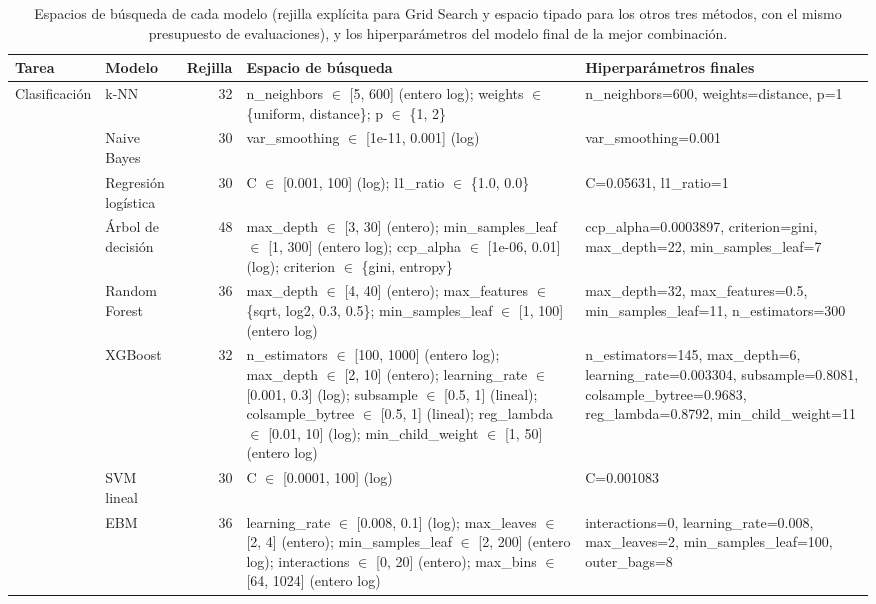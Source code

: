 \begin{table}
\caption{Espacios de búsqueda de cada modelo (rejilla explícita para Grid Search y espacio tipado para los otros tres métodos, con el mismo presupuesto de evaluaciones), y los hiperparámetros del modelo final de la mejor combinación.}\label{tab:espacios}
\scriptsize\setlength{\tabcolsep}{2.8pt}
\begin{tabular}{llr>{\raggedright\arraybackslash}p{6.2cm}>{\raggedright\arraybackslash}p{5cm}}
\toprule
\textbf{Tarea} & \textbf{Modelo} & \textbf{Rejilla} & \textbf{Espacio de búsqueda} & \textbf{Hiperparámetros finales} \\
\midrule
Clasificación & k-NN & 32 & n\_neighbors $\in$ [5, 600] (entero log); weights $\in$ \{uniform, distance\}; p $\in$ \{1, 2\} & n\_neighbors=600, weights=distance, p=1 \\
 & Naive Bayes & 30 & var\_smoothing $\in$ [1e-11, 0.001] (log) & var\_smoothing=0.001 \\
 & Regresión logística & 30 & C $\in$ [0.001, 100] (log); l1\_ratio $\in$ \{1.0, 0.0\} & C=0.05631, l1\_ratio=1 \\
 & Árbol de decisión & 48 & max\_depth $\in$ [3, 30] (entero); min\_samples\_leaf $\in$ [1, 300] (entero log); ccp\_alpha $\in$ [1e-06, 0.01] (log); criterion $\in$ \{gini, entropy\} & ccp\_alpha=0.0003897, criterion=gini, max\_depth=22, min\_samples\_leaf=7 \\
 & Random Forest & 36 & max\_depth $\in$ [4, 40] (entero); max\_features $\in$ \{sqrt, log2, 0.3, 0.5\}; min\_samples\_leaf $\in$ [1, 100] (entero log) & max\_depth=32, max\_features=0.5, min\_samples\_leaf=11, n\_estimators=300 \\
 & XGBoost & 32 & n\_estimators $\in$ [100, 1000] (entero log); max\_depth $\in$ [2, 10] (entero); learning\_rate $\in$ [0.001, 0.3] (log); subsample $\in$ [0.5, 1] (lineal); colsample\_bytree $\in$ [0.5, 1] (lineal); reg\_lambda $\in$ [0.01, 10] (log); min\_child\_weight $\in$ [1, 50] (entero log) & n\_estimators=145, max\_depth=6, learning\_rate=0.003304, subsample=0.8081, colsample\_bytree=0.9683, reg\_lambda=0.8792, min\_child\_weight=11 \\
 & SVM lineal & 30 & C $\in$ [0.0001, 100] (log) & C=0.001083 \\
 & EBM & 36 & learning\_rate $\in$ [0.008, 0.1] (log); max\_leaves $\in$ [2, 4] (entero); min\_samples\_leaf $\in$ [2, 200] (entero log); interactions $\in$ [0, 20] (entero); max\_bins $\in$ [64, 1024] (entero log) & interactions=0, learning\_rate=0.008, max\_leaves=2, min\_samples\_leaf=100, outer\_bags=8 \\

\end{tabular}
\end{table}
